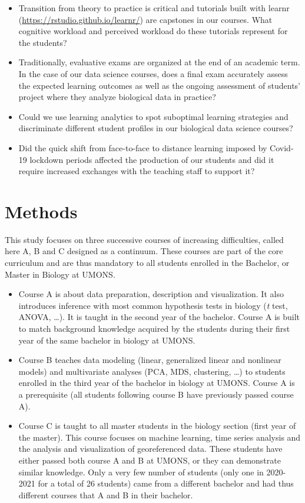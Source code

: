 \documentclass{aims}
\theoremstyle{definition}
\begin{document}
\begin{itemize}
\item
  Transition from theory to practice is critical and tutorials built
  with learnr (\url{https://rstudio.github.io/learnr/}) are capstones in
  our courses. What cognitive workload and perceived workload do these
  tutorials represent for the students?
\item
  Traditionally, evaluative exams are organized at the end of an
  academic term. In the case of our data science courses, does a final
  exam accurately assess the expected learning outcomes as well as the
  ongoing assessment of students' project where they analyze biological
  data in practice?
\item
  Could we use learning analytics to spot suboptimal learning strategies
  and discriminate different student profiles in our biological data
  science courses?
\item
  Did the quick shift from face-to-face to distance learning imposed by
  Covid-19 lockdown periods affected the production of our students and
  did it require increased exchanges with the teaching staff to support
  it?
\end{itemize}

\hypertarget{methods}{%
\section{Methods}\label{methods}}

This study focuses on three successive courses of increasing
difficulties, called here A, B and C designed as a continuum. These
courses are part of the core curriculum and are thus mandatory to all
students enrolled in the Bachelor, or Master in Biology at UMONS.

\begin{itemize}
\item
  Course A is about data preparation, description and visualization. It
  also introduces inference with most common hypothesis tests in biology
  (\emph{t} test, ANOVA, \ldots). It is taught in the second year of the
  bachelor. Course A is built to match background knowledge acquired by
  the students during their first year of the same bachelor in biology
  at UMONS.
\item
  Course B teaches data modeling (linear, generalized linear and
  nonlinear models) and multivariate analyses (PCA, MDS, clustering,
  \ldots) to students enrolled in the third year of the bachelor in
  biology at UMONS. Course A is a prerequisite (all students following
  course B have previously passed course A).
\item
  Course C is taught to all master students in the biology section
  (first year of the master). This course focuses on machine learning,
  time series analysis and the analysis and visualization of
  georeferenced data. These students have either passed both course A
  and B at UMONS, or they can demonstrate similar knowledge. Only a very
  few number of students (only one in 2020-2021 for a total of 26
  students) came from a different bachelor and had thus different
  courses that A and B in their bachelor.
\end{itemize}
\end{document}
